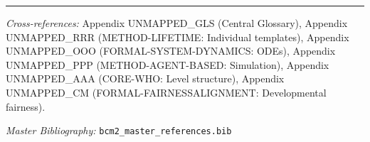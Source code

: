 
\vspace{1em}
\hrule
\vspace{0.5em}

\noindent\textit{Cross-references:}
Appendix UNMAPPED_GLS (Central Glossary),
Appendix UNMAPPED_RRR (METHOD-LIFETIME: Individual templates),
Appendix UNMAPPED_OOO (FORMAL-SYSTEM-DYNAMICS: ODEs),
Appendix UNMAPPED_PPP (METHOD-AGENT-BASED: Simulation),
Appendix UNMAPPED_AAA (CORE-WHO: Level structure),
Appendix UNMAPPED_CM (FORMAL-FAIRNESSALIGNMENT: Developmental fairness).

\noindent\textit{Master Bibliography:} \texttt{bcm2\_master\_references.bib}


